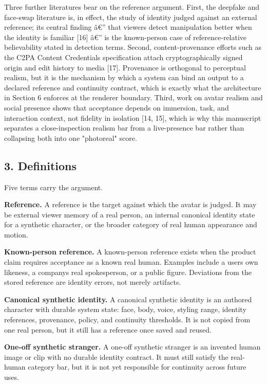 \documentclass[
]{article}
\begin{document}
Three further literatures bear on the reference argument. First, the
deepfake and face-swap literature is, in effect, the study of identity
judged against an external reference; its central finding â€'' that
viewers detect manipulation better when the identity is familiar
{[}16{]} â€'' is the known-person case of reference-relative
believability stated in detection terms. Second, content-provenance
efforts such as the C2PA Content Credentials specification attach
cryptographically signed origin and edit history to media {[}17{]}.
Provenance is orthogonal to perceptual realism, but it is the mechanism
by which a system can bind an output to a declared reference and
continuity contract, which is exactly what the architecture in Section 6
enforces at the renderer boundary. Third, work on avatar realism and
social presence shows that acceptance depends on immersion, task, and
interaction context, not fidelity in isolation {[}14, 15{]}, which is
why this manuscript separates a close-inspection realism bar from a
live-presence bar rather than collapsing both into one "photoreal"
score.

\subsection{3. Definitions}\label{3-definitions}

Five terms carry the argument.

\textbf{Reference.} A reference is the target against which the avatar
is judged. It may be external viewer memory of a real person, an
internal canonical identity state for a synthetic character, or the
broader category of real human appearance and motion.

\textbf{Known-person reference.} A known-person reference exists when
the product claim requires acceptance as a known real human. Examples
include a user\textquotesingle s own likeness, a
company\textquotesingle s real spokesperson, or a public figure.
Deviations from the stored reference are identity errors, not merely
artifacts.

\textbf{Canonical synthetic identity.} A canonical synthetic identity is
an authored character with durable system state: face, body, voice,
styling range, identity references, provenance, policy, and continuity
thresholds. It is not copied from one real person, but it still has a
reference once saved and reused.

\textbf{One-off synthetic stranger.} A one-off synthetic stranger is an
invented human image or clip with no durable identity contract. It must
still satisfy the real-human category bar, but it is not yet responsible
for continuity across future uses.
\end{document}
